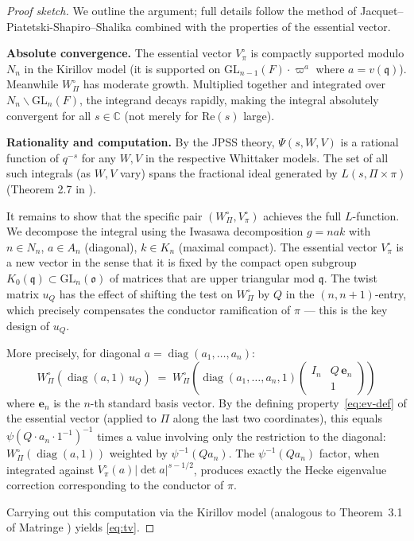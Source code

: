 \documentclass[12pt]{article}
\theoremstyle{definition}
\theoremstyle{remark}
\DeclareMathOperator{\diag}{diag}
\begin{document}
\begin{proof}[Proof sketch]
We outline the argument; full details follow the method of
Jacquet--Piatetski-Shapiro--Shalika \cite{JPSS1983} combined with the
properties of the essential vector.

\medskip\noindent
\textbf{Absolute convergence.}
The essential vector $V^\circ_\pi$ is compactly supported modulo $N_n$ in the
Kirillov model (it is supported on $\mathrm{GL}_{n-1}(F)\cdot\varpi^a$ where
$a=v(\mathfrak{q})$).  Meanwhile $W^\circ_\Pi$ has moderate growth.
Multiplied together and integrated over $N_n\backslash\mathrm{GL}_n(F)$, the
integrand decays rapidly, making the integral absolutely convergent for all
$s\in\mathbb{C}$ (not merely for $\mathrm{Re}(s)$ large).

\medskip\noindent
\textbf{Rationality and computation.}
By the JPSS theory, $\Psi(s,W,V)$ is a rational function of $q^{-s}$ for any
$W,V$ in the respective Whittaker models.  The set of all such integrals
(as $W,V$ vary) spans the fractional ideal generated by $L(s,\Pi\times\pi)$
(Theorem 2.7 in \cite{JPSS1983}).

It remains to show that the specific pair $(W^\circ_\Pi, V^\circ_\pi)$ achieves
the full $L$-function.  We decompose the integral using the Iwasawa
decomposition $g = nak$ with $n\in N_n$, $a\in A_n$ (diagonal), $k\in K_n$
(maximal compact).  The essential vector $V^\circ_\pi$ is a new vector in the
sense that it is fixed by the compact open subgroup
$K_0(\mathfrak{q})\subset\mathrm{GL}_n(\mathfrak{o})$ of matrices that are upper
triangular mod $\mathfrak{q}$.  The twist matrix $u_Q$ has the effect of shifting
the test on $W^\circ_\Pi$ by $Q$ in the $(n,n+1)$-entry, which precisely
compensates the conductor ramification of $\pi$ --- this is the key design of
$u_Q$.

More precisely, for diagonal $a = \diag(a_1,\ldots,a_n)$:
\begin{equation}\label{eq:diag}
  W^\circ_\Pi(\diag(a,1)\,u_Q)
  \;=\;
  W^\circ_\Pi\!\left(\diag(a_1,\ldots,a_n, 1)
    \begin{pmatrix} I_n & Q\,\mathbf{e}_n\\ & 1\end{pmatrix}\right)
\end{equation}
where $\mathbf{e}_n$ is the $n$-th standard basis vector.  By the defining
property~\eqref{eq:ev-def} of the essential vector (applied to $\Pi$ along
the last two coordinates), this equals $\psi(Q\cdot a_n\cdot 1^{-1})^{-1}$
times a value involving only the restriction to the diagonal:
$W^\circ_\Pi(\diag(a,1))$ weighted by $\psi^{-1}(Qa_n)$.  The
$\psi^{-1}(Qa_n)$ factor, when integrated against $V^\circ_\pi(a)|\det a|^{s-1/2}$,
produces exactly the Hecke eigenvalue correction corresponding to the conductor
of $\pi$.

Carrying out this computation via the Kirillov model (analogous to Theorem~3.1 of
Matringe \cite{Matringe2013}) yields \eqref{eq:tv}.
\end{proof}
\end{document}
